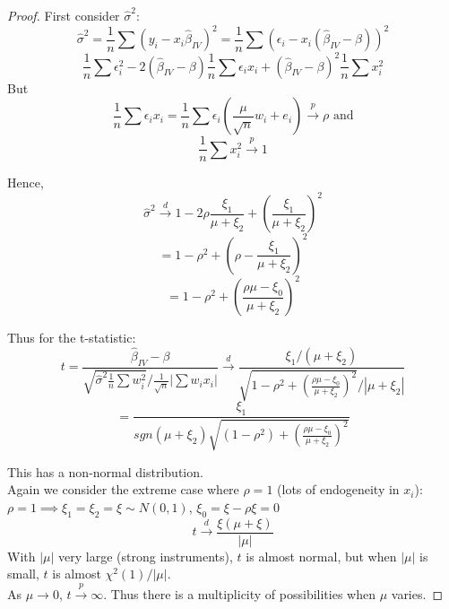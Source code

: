 \documentclass[DIV=14,titlepage=false]{scrreprt}
\begin{document}
\begin{proof}
First consider \(\hat\sigma^2\):
\[\hat \sigma^2=\frac{1}{n}\sum(y_i-x_i\hat\beta_{IV})^2=\frac{1}{n}\sum (\epsilon_i-x_i(\hat\beta_{IV}-\beta))^2\]
\[\frac{1}{n}\sum \epsilon_i^2 - 2(\hat\beta_{IV}-\beta)\frac{1}{n}\sum \epsilon_ix_i+(\hat\beta_{IV}-\beta)^2\frac{1}{n}\sum x_i^2\]
But
\[\frac{1}{n}\sum \epsilon_ix_i=\frac{1}{n}\sum \epsilon_i\left(\frac{\mu}{\sqrt{n}}w_i+e_i\right)\xrightarrow{p}\rho \text{ and}\]
\[\frac{1}{n}\sum x_i^2\xrightarrow{p}1\]

Hence,
\[\hat\sigma^2\xrightarrow{d}1-2\rho\frac{\xi_1}{\mu+\xi_2}+\left(\frac{\xi_1}{\mu+\xi_2}\right)^2\]
\[=1-\rho^2+\left(\rho-\frac{\xi_1}{\mu+\xi_2}\right)^2\]
\[=1-\rho^2+\left(\frac{\rho\mu-\xi_0}{\mu+\xi_2}\right)^2\]

Thus for the t-statistic:
\[t=\frac{\hat \beta_{IV}-\beta}{\sqrt{\hat\sigma^2\frac{1}{n}\sum w_i^2}/\frac{1}{\sqrt{n}}|\sum w_ix_i|}\xrightarrow{d}\frac{\xi_1/(\mu+\xi_2)}{\sqrt{1-\rho^2+(\frac{\rho\mu-\xi_0}{\mu+\xi_2})^2}/|\mu+\xi_2|}\]
\[=\frac{\xi_1}{sgn(\mu+\xi_2)\sqrt{(1-\rho^2)+(\frac{\rho\mu-\xi_0}{\mu+\xi_2})^2}}\]

This has a non-normal distribution.
\\ Again we consider the extreme case where \(\rho=1\) (lots of endogeneity in \(x_i\)):
\\ \(\rho=1 \implies \xi_1=\xi_2=\xi\sim N(0,1)\), \(\xi_0=\xi-\rho\xi=0\)
\[t\xrightarrow{d}\frac{\xi(\mu+\xi)}{|\mu|}\]
With \(|\mu|\) very large (strong instruments), \(t\) is almost normal, but when \(|\mu|\) is small, \(t\) is almost \(\chi^2(1)/|\mu|\).
\\ As \(\mu\rightarrow0\), \(t\xrightarrow{p}\infty\).
Thus there is a multiplicity of possibilities when \(\mu\) varies.
\end{proof}
\vspace{5mm}
\end{document}
